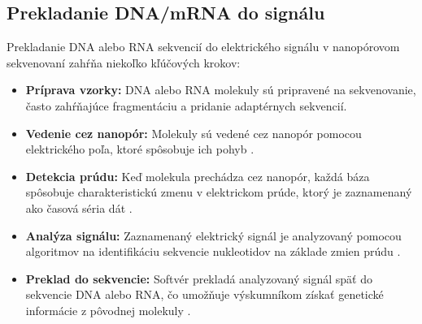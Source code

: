 \subsection{Prekladanie DNA/mRNA do signálu}
Prekladanie DNA alebo RNA sekvencií do elektrického signálu v nanopórovom sekvenovaní \cite{Zheng2023Nanopore} zahŕňa niekoľko kľúčových krokov:
\begin{itemize}
    \item \textbf{Príprava vzorky:} DNA alebo RNA molekuly sú pripravené na sekvenovanie, často zahŕňajúce fragmentáciu a pridanie adaptérnych sekvencií.
    \item \textbf{Vedenie cez nanopór:} Molekuly sú vedené cez nanopór pomocou elektrického poľa, ktoré spôsobuje ich pohyb \cite{Zheng2023Nanopore}.
    \item \textbf{Detekcia prúdu:} Keď molekula prechádza cez nanopór, každá báza spôsobuje charakteristickú zmenu v elektrickom prúde, ktorý je zaznamenaný ako časová séria dát \cite{Zheng2023Nanopore}.
    \item \textbf{Analýza signálu:} Zaznamenaný elektrický signál je analyzovaný pomocou algoritmov na identifikáciu sekvencie nukleotidov na základe zmien prúdu \cite{Zheng2023Nanopore}.
    \item \textbf{Preklad do sekvencie:} Softvér prekladá analyzovaný signál späť do sekvencie DNA alebo RNA, čo umožňuje výskumníkom získať genetické informácie z pôvodnej molekuly \cite{Zheng2023Nanopore}.
\end{itemize}
